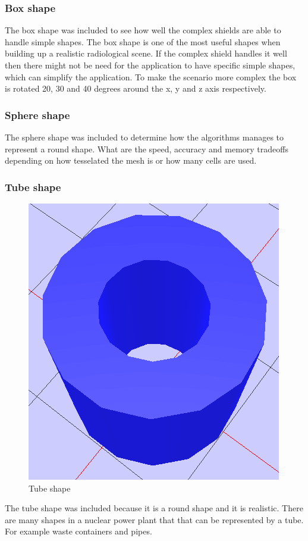 \documentclass[11pt,twoside,a4paper]{report}
\begin{document}
\subsubsection{Box shape}
The box shape was included to see how well the complex shields are able to handle simple shapes. The box shape is one of the most useful shapes when building up a realistic radiological scene. If the complex shield handles it well then there might not be need for the application to have specific simple shapes, which can simplify the application. To make the scenario more complex the box is rotated 20, 30 and 40 degrees around the x, y and z axis respectively.

\subsubsection{Sphere shape}
The sphere shape was included to determine how the algorithms manages to represent a round shape. What are the speed, accuracy and memory tradeoffs depending on how tesselated the mesh is or how many cells are used. 

\subsubsection{Tube shape}
\begin{figure}[h]
    \centering
    \includegraphics[width=0.45\linewidth]{images/tube_mesh}
    \caption{Tube shape}
    \label{fig:Tube shape}
\end{figure}

The tube shape was included because it is a round shape and it is realistic. There are many shapes in a nuclear power plant that that can be represented by a tube. For example waste containers and pipes.
\end{document}
